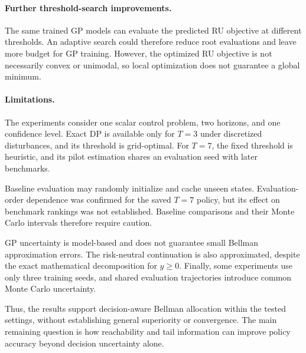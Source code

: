 \paragraph{Further threshold-search improvements.}

The same trained GP models can evaluate the predicted RU objective at different thresholds. An adaptive search could therefore reduce root evaluations and leave more budget for GP training. However, the optimized RU objective is not necessarily convex or unimodal, so local optimization does not guarantee a global minimum.

\paragraph{Limitations.}

The experiments consider one scalar control problem, two horizons, and one confidence level. Exact DP is available only for $T=3$ under discretized disturbances, and its threshold is grid-optimal. For $T=7$, the fixed threshold is heuristic, and its pilot estimation shares an evaluation seed with later benchmarks.

Baseline evaluation may randomly initialize and cache unseen states. Evaluation-order dependence was confirmed for the saved $T=7$ policy, but its effect on benchmark rankings was not established. Baseline comparisons and their Monte Carlo intervals therefore require caution.

GP uncertainty is model-based and does not guarantee small Bellman approximation errors. The risk-neutral continuation is also approximated, despite the exact mathematical decomposition for $y\geq0$. Finally, some experiments use only three training seeds, and shared evaluation trajectories introduce common Monte Carlo uncertainty.

Thus, the results support decision-aware Bellman allocation within the tested settings, without establishing general superiority or convergence. The main remaining question is how reachability and tail information can improve policy accuracy beyond decision uncertainty alone.
